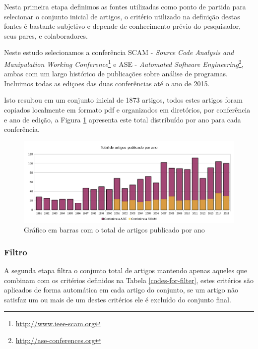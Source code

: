 Nesta primeira etapa definimos as fontes utilizadas como ponto de partida para
selecionar o conjunto inicial de artigos, o critério utilizado na definição
destas fontes é bastante subjetivo e depende de conhecimento prévio do
pesquisador, seus pares, e colaboradores.

Neste estudo selecionamos a conferência SCAM - {\it Source Code Analysis and
Manipulation Working Conference}\footnote{\url{http://www.ieee-scam.org}} e ASE
- {\it Automated Software Engineering}\footnote{\url{http://ase-conferences.org}},
ambas com um largo histórico de publicações sobre análise de programas.
Incluimos todas as ediçoes das duas conferências até o ano de 2015.

Isto resultou em um conjunto inicial de 1873 artigos, todos estes artigos foram
copiados localmente em formato pdf e organizados em diretórios, por conferência
e ano de edição, a Figura \ref{artigos-por-ano} apresenta este total distribuído
por ano para cada conferência.

\begin{figure}[h]
  \center
  \includegraphics[scale=0.65]{imagens/artigos-por-ano.png}
  \caption{Gráfico em barras com o total de artigos publicado por ano}
  \label{artigos-por-ano}
\end{figure}

\subsubsection{Filtro}


A segunda etapa filtra o conjunto total de artigos mantendo apenas aqueles que
combinam com os critérios definidos na Tabela \ref{codes-for-filter}, estes
critérios são aplicados de forma automática em cada artigo do conjunto, se um
artigo não satisfaz um ou mais de um destes critérios ele é excluído do
conjunto final.

